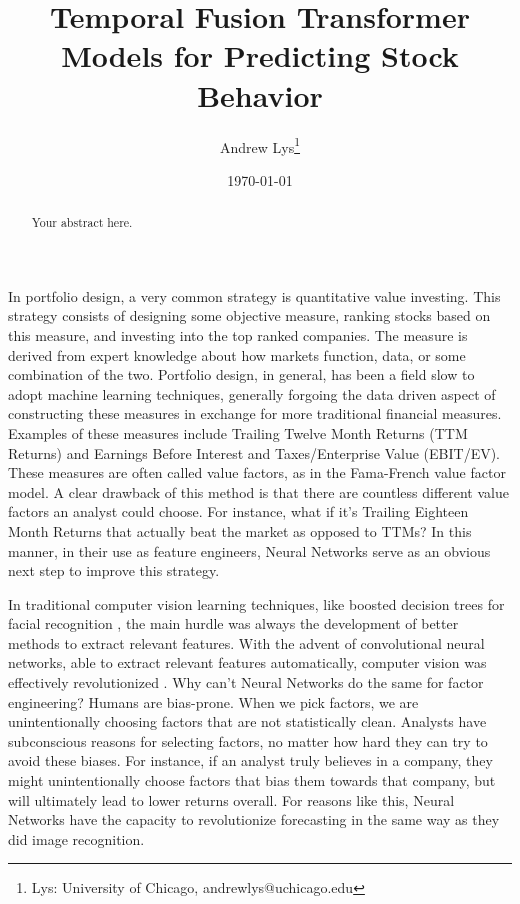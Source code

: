 \documentclass[AER]{AEA}
\begin{document}
\title{Temporal Fusion Transformer Models for Predicting Stock Behavior}
\author{Andrew Lys\thanks{Lys: University of Chicago, andrewlys@uchicago.edu}}
\date{\today}
\JEL{}
\Keywords{}

\begin{abstract}
Your abstract here.
\end{abstract}


\maketitle
In portfolio design, a very common strategy is quantitative value investing. This strategy consists of designing some objective measure, ranking stocks based on this measure, and investing into the top ranked companies. The measure is derived from expert knowledge about how markets function, data, or some combination of the two. Portfolio design, in general, has been a field slow to adopt machine learning techniques, generally forgoing the data driven aspect of constructing these measures in exchange for more traditional financial measures. Examples of these measures include Trailing Twelve Month Returns (TTM Returns) and Earnings Before Interest and Taxes/Enterprise Value (EBIT/EV). These measures are often called value factors, as in the Fama-French value factor model. A clear drawback of this method is that there are countless different value factors an analyst could choose. For instance, what if it's Trailing Eighteen Month Returns that actually beat the market as opposed to TTMs? In this manner, in their use as feature engineers, Neural Networks serve as an obvious next step to improve this strategy.

In traditional computer vision learning techniques, like boosted decision trees for facial recognition \cite{ada-boost}, the main hurdle was always the development of better methods to extract relevant features. With the advent of convolutional neural networks, able to extract relevant features automatically, computer vision was effectively revolutionized \cite{alexnet}. Why can't Neural Networks do the same for factor engineering? Humans are bias-prone. When we pick factors, we are unintentionally choosing factors that are not statistically clean. Analysts have subconscious reasons for selecting factors, no matter how hard they can try to avoid these biases. For instance, if an analyst truly believes in a company, they might unintentionally choose factors that bias them towards that company, but will ultimately lead to lower returns overall. For reasons like this, Neural Networks have the capacity to revolutionize forecasting in the same way as they did image recognition. 
\end{document}
